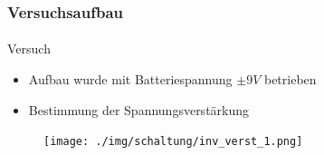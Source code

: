 \begin{frame}
\frametitle{Versuchsaufbau}
\framesubtitle{}
    \begin{block}{Versuch}
        \begin{itemize}
            \item Aufbau wurde mit Batteriespannung $\pm 9V$ betrieben
            \item Bestimmung der Spannungsverstärkung
        \end{itemize}    
    \end{block}    
    \begin{figure}[H]
    \begin{center}
            \texttt{[image: ./img/schaltung/inv\_verst\_1.png]}
    \end{center}
    \end{figure}
\end{frame}

